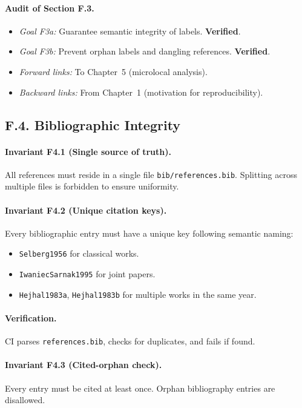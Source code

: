 \paragraph{Audit of Section F.3.}
\begin{itemize}
  \item \emph{Goal F3a:} Guarantee semantic integrity of labels.
        \textbf{Verified}.
  \item \emph{Goal F3b:} Prevent orphan labels and dangling references.
        \textbf{Verified}.
  \item \emph{Forward links:} To Chapter~5 (microlocal analysis).
  \item \emph{Backward links:} From Chapter~1 (motivation for
        reproducibility).
\end{itemize}

\subsection*{F.4. Bibliographic Integrity}

\paragraph{Invariant F4.1 (Single source of truth).}
All references must reside in a single file
\texttt{bib/references.bib}. Splitting across multiple files is
forbidden to ensure uniformity.

\paragraph{Invariant F4.2 (Unique citation keys).}
Every bibliographic entry must have a unique key following semantic
naming:
\begin{itemize}
  \item \texttt{Selberg1956} for classical works.
  \item \texttt{IwaniecSarnak1995} for joint papers.
  \item \texttt{Hejhal1983a}, \texttt{Hejhal1983b} for multiple works
        in the same year.
\end{itemize}

\paragraph{Verification.}
CI parses \texttt{references.bib}, checks for duplicates, and fails if
found.

\paragraph{Invariant F4.3 (Cited-orphan check).}
Every entry must be cited at least once. Orphan bibliography entries
are disallowed.

